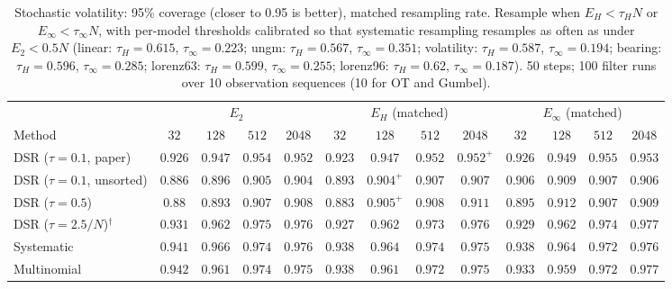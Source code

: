 \begin{table}[ht]
\centering
\small
\caption{Stochastic volatility: 95\% coverage (closer to 0.95 is better), matched resampling rate. Resample when $E_H<\tau_HN$ or $E_\infty<\tau_\infty N$, with per-model thresholds calibrated so that systematic resampling resamples as often as under $E_2<0.5N$ (linear: $\tau_H{=}0.615$, $\tau_\infty{=}0.223$; ungm: $\tau_H{=}0.567$, $\tau_\infty{=}0.351$; volatility: $\tau_H{=}0.587$, $\tau_\infty{=}0.194$; bearing: $\tau_H{=}0.596$, $\tau_\infty{=}0.285$; lorenz63: $\tau_H{=}0.599$, $\tau_\infty{=}0.255$; lorenz96: $\tau_H{=}0.62$, $\tau_\infty{=}0.187$). 50 steps; 100 filter runs over 10 observation sequences (10 for OT and Gumbel).}
\label{tab:trigger-matched-volatility-coverage95}
\begin{adjustbox}{max width=\linewidth}
\begin{tabular}{lcccc|cccc|cccc}
\toprule
 & \multicolumn{4}{c}{$E_2$} & \multicolumn{4}{c}{$E_H$ (matched)} & \multicolumn{4}{c}{$E_\infty$ (matched)} \\
\cmidrule(lr){2-5} \cmidrule(lr){6-9} \cmidrule(lr){10-13}
Method & $32$ & $128$ & $512$ & $2048$ & $32$ & $128$ & $512$ & $2048$ & $32$ & $128$ & $512$ & $2048$ \\
\midrule
DSR ($\tau{=}0.1$, paper) & $\mathbf{0.926}$ & $0.947$ & $0.954$ & $\mathbf{0.952}$ & $0.923$ & $0.947$ & $\mathbf{0.952}$ & $0.952^{+}$ & $0.926$ & $\mathbf{0.949}$ & $0.955$ & $0.953$ \\
DSR ($\tau{=}0.1$, unsorted) & $0.886$ & $0.896$ & $0.905$ & $0.904$ & $0.893$ & $0.904^{+}$ & $0.907$ & $\mathbf{0.907}$ & $\mathbf{0.906}$ & $\mathbf{0.909}$ & $\mathbf{0.907}$ & $0.906$ \\
DSR ($\tau{=}0.5$) & $0.88$ & $0.893$ & $0.907$ & $0.908$ & $0.883$ & $0.905^{+}$ & $\mathbf{0.908}$ & $\mathbf{0.911}$ & $\mathbf{0.895}$ & $\mathbf{0.912}$ & $0.907$ & $0.909$ \\
DSR ($\tau{=}2.5/N$)$^\dagger$ & $\mathbf{0.931}$ & $\mathbf{0.962}$ & $0.975$ & $0.976$ & $0.927$ & $\mathbf{0.962}$ & $\mathbf{0.973}$ & $\mathbf{0.976}$ & $0.929$ & $0.962$ & $0.974$ & $0.977$ \\
\midrule
Systematic & $\mathbf{0.941}$ & $0.966$ & $0.974$ & $0.976$ & $0.938$ & $\mathbf{0.964}$ & $0.974$ & $\mathbf{0.975}$ & $0.938$ & $\mathbf{0.964}$ & $\mathbf{0.972}$ & $0.976$ \\
Multinomial & $\mathbf{0.942}$ & $0.961$ & $0.974$ & $\mathbf{0.975}$ & $0.938$ & $0.961$ & $\mathbf{0.972}$ & $0.975$ & $0.933$ & $\mathbf{0.959}$ & $0.972$ & $0.977$ \\

\end{tabular}
\end{adjustbox}
\end{table}
